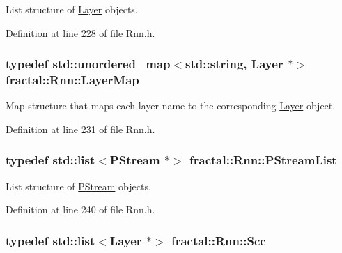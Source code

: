 List structure of \hyperlink{classfractal_1_1Layer}{Layer} objects. 



Definition at line 228 of file Rnn.\+h.

\hypertarget{classfractal_1_1Rnn_a41ef29c0e8d4bfa783a6abe33b685ec0}{
\subsubsection[{Layer\+Map}]{\setlength{\rightskip}{0pt plus 5cm}typedef std\+::unordered\+\_\+map$<$std\+::string, {\bf Layer} $\ast$$>$ {\bf fractal\+::\+Rnn\+::\+Layer\+Map}\hspace{0.3cm}{\ttfamily [protected]}}}\label{classfractal_1_1Rnn_a41ef29c0e8d4bfa783a6abe33b685ec0}


Map structure that maps each layer name to the corresponding \hyperlink{classfractal_1_1Layer}{Layer} object. 



Definition at line 231 of file Rnn.\+h.

\hypertarget{classfractal_1_1Rnn_af804f677610b7429ca199ac35510e503}{
\subsubsection[{P\+Stream\+List}]{\setlength{\rightskip}{0pt plus 5cm}typedef std\+::list$<${\bf P\+Stream} $\ast$$>$ {\bf fractal\+::\+Rnn\+::\+P\+Stream\+List}\hspace{0.3cm}{\ttfamily [protected]}}}\label{classfractal_1_1Rnn_af804f677610b7429ca199ac35510e503}


List structure of \hyperlink{classfractal_1_1PStream}{P\+Stream} objects. 



Definition at line 240 of file Rnn.\+h.

\hypertarget{classfractal_1_1Rnn_aea69a9549eee7a4de8163e2bc6be19a1}{
\subsubsection[{Scc}]{\setlength{\rightskip}{0pt plus 5cm}typedef std\+::list$<${\bf Layer} $\ast$$>$ {\bf fractal\+::\+Rnn\+::\+Scc}\hspace{0.3cm}{\ttfamily [protected]}}}\label{classfractal_1_1Rnn_aea69a9549eee7a4de8163e2bc6be19a1}


